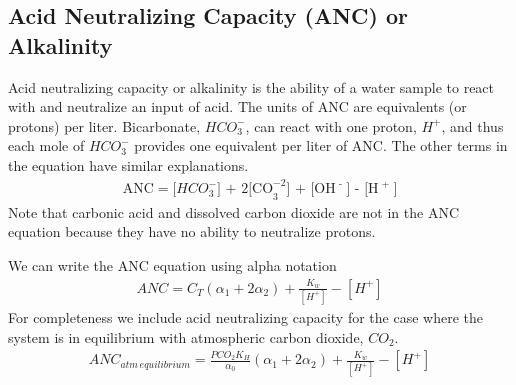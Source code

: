\documentclass[letterpaper,10pt,english]{sphinxmanual}
\begin{document}
\subsection{Acid Neutralizing Capacity (ANC) or Alkalinity}
\label{\detokenize{Rapid_Mix/RM_Derivations:acid-neutralizing-capacity-anc-or-alkalinity}}\label{\detokenize{Rapid_Mix/RM_Derivations:heading-acid-neutralizing-capacity-anc-or-alkalinity}}
Acid neutralizing capacity or alkalinity is the ability of a water sample to react with and neutralize an input of acid. The units of ANC are equivalents (or protons) per liter. Bicarbonate, \(HCO_3^-\), can react with one proton, \(H^+\), and thus each mole of \(HCO_3^-\) provides one equivalent per liter of ANC. The other terms in the equation have similar explanations.
\begin{equation}\label{equation:Rapid_Mix/RM_Derivations:Rapid_Mix/RM_Derivations:14}
\begin{split}{\text{ANC}} = [HCO_3^ - {\text{] + 2[CO}}_3^{ - 2}{\text{] + [O}}{{\text{H}}^{\text{ - }}}{\text{] - [}}{{\text{H}}^{\text{ + }}}{\text{]}}\end{split}
\end{equation}
Note that carbonic acid and dissolved carbon dioxide are not in the ANC equation because they have no ability to neutralize protons.

We can write the ANC equation using alpha notation
\begin{equation}\label{equation:Rapid_Mix/RM_Derivations:Rapid_Mix/RM_Derivations:15}
\begin{split}ANC = {C_T}({\alpha_1} + 2{\alpha_2}) + \frac{{{K_w}}}{{\left[ {{H^ + }} \right]}} - \left[ {{H^ + }} \right]\end{split}
\end{equation}
For completeness we include acid neutralizing capacity for the case where the system is in equilibrium with atmospheric carbon dioxide,
\(CO_2\).
\begin{equation}\label{equation:Rapid_Mix/RM_Derivations:Rapid_Mix/RM_Derivations:16}
\begin{split}ANC_{atm\,equilibrium} = \frac{{{P{C{O_2}}}{K_H}}}{{{\alpha_0}}}({\alpha_1} + 2{\alpha_2}) + \frac{{{K_w}}}{{\left[ {{H^ + }} \right]}} - \left[ {{H^ + }} \right]\end{split}
\end{equation}
\end{document}
